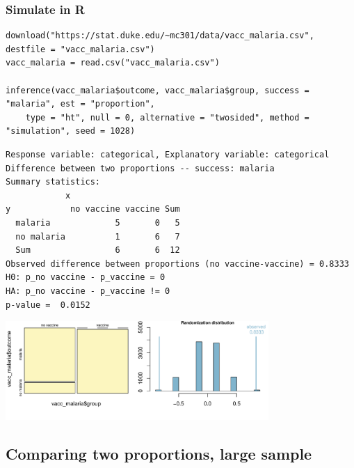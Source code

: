 \documentclass[slidestop,compress,mathserif,12pt,t,professionalfonts,xcolor=table]{beamer}
\begin{document}
\begin{frame}[fragile]
\frametitle{Simulate in R}

\vspace{-0.25cm}

{\tiny
\begin{Verbatim}[frame=single, formatcom=\color{blue}]
download("https://stat.duke.edu/~mc301/data/vacc_malaria.csv", destfile = "vacc_malaria.csv")
vacc_malaria = read.csv("vacc_malaria.csv")

inference(vacc_malaria$outcome, vacc_malaria$group, success = "malaria", est = "proportion", 
    type = "ht", null = 0, alternative = "twosided", method = "simulation", seed = 1028)
\end{Verbatim}
}

\pause

{\tiny
\begin{Verbatim}[frame=single, formatcom=\color{gray}]
Response variable: categorical, Explanatory variable: categorical
Difference between two proportions -- success: malaria
Summary statistics:
            x
y            no vaccine vaccine Sum
  malaria             5       0   5
  no malaria          1       6   7
  Sum                 6       6  12
Observed difference between proportions (no vaccine-vaccine) = 0.8333
H0: p_no vaccine - p_vaccine = 0 
HA: p_no vaccine - p_vaccine != 0 
p-value =  0.0152 
\end{Verbatim}
}

\includegraphics[width=0.75\textwidth]{figures/malaria/malaria}

\end{frame}


\subsection{Comparing two proportions, large sample}


\begin{frame}

\vfill


\vfill

\end{frame}
\end{document}
